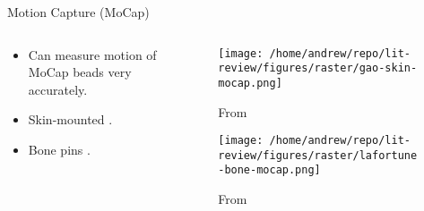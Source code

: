 \documentclass[presentation, aspectratio=1610]{beamer}
\begin{document}
\begin{frame}[label={sec:org95be4a5}]{Motion Capture (MoCap)}
\begin{columns}
\begin{column}{0.5\columnwidth}
\begin{itemize}
\item Can measure motion of MoCap beads very accurately.
\item Skin-mounted \autocites{gaoInvestigationSoftTissue2008}[][]{kuoInfluenceSoftTissue2011}[][]{linEffectsSoftTissue2016}.
\item Bone pins \autocite{lafortuneThreedimensionalKinematicsHuman1992}.
\end{itemize}
\end{column}

\begin{column}{0.6\columnwidth}
\begin{figure}[htbp]
\centering
\texttt{[image: /home/andrew/repo/lit-review/figures/raster/gao-skin-mocap.png]}
\caption{From \autocite{gaoInvestigationSoftTissue2008}}
\end{figure}
\vspace{-0.25in}
\begin{figure}[htbp]
\centering
\texttt{[image: /home/andrew/repo/lit-review/figures/raster/lafortune-bone-mocap.png]}
\caption{From \autocite{lafortuneThreedimensionalKinematicsHuman1992}}
\end{figure}
\end{column}
\end{columns}
\end{frame}
\end{document}
